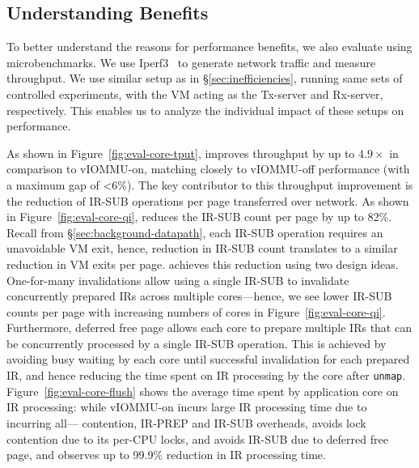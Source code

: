 \subsection{Understanding {\name} Benefits}
\label{ssec:micro}

To better understand the reasons for {\name} performance benefits, we also evaluate {\name} using microbenchmarks. We use Iperf3~\cite{iperf3} to generate network traffic and measure throughput. We use similar setup as in \S\ref{sec:inefficiencies}, running same sets of controlled experiments, with the VM acting as the Tx-server and Rx-server, respectively. This enables us to analyze the individual impact of these setups on {\name} performance.



As shown in Figure~\ref{fig:eval-core-tput}, {\name} improves throughput by up to $4.9\times$ in comparison to vIOMMU-on, 
matching closely to vIOMMU-off performance (with a maximum gap of <6\%).
The key contributor to this throughput improvement is the reduction of IR-SUB operations per page transferred over network. As shown in Figure~\ref{fig:eval-core-qi}, {\name} reduces the IR-SUB count per page by up to 82\%. Recall from \S\ref{sec:background-datapath}, each IR-SUB operation requires an unavoidable VM exit, hence, reduction in IR-SUB count translates to a similar reduction in VM exits per page. {\name} achieves this reduction using two design ideas. One-for-many invalidations allow using a single IR-SUB to invalidate concurrently prepared IRs across multiple cores---hence, we see lower IR-SUB counts per page with increasing numbers of cores in Figure~\ref{fig:eval-core-qi}. Furthermore, deferred free page allows each core to prepare multiple IRs that can be concurrently processed by a single IR-SUB operation. This is achieved by avoiding busy waiting by each core until successful invalidation for each prepared IR, and hence reducing the time spent on IR processing by the core after {\tt unmap}. Figure~\ref{fig:eval-core-flush} shows the average time spent by application core on IR processing: while vIOMMU-on incurs large IR processing time due to incurring all--- contention, IR-PREP and IR-SUB overheads,  {\name} avoids lock contention due to its per-CPU locks, and avoids IR-SUB due to deferred free page, and observes up to 99.9\% reduction in IR processing time. 

